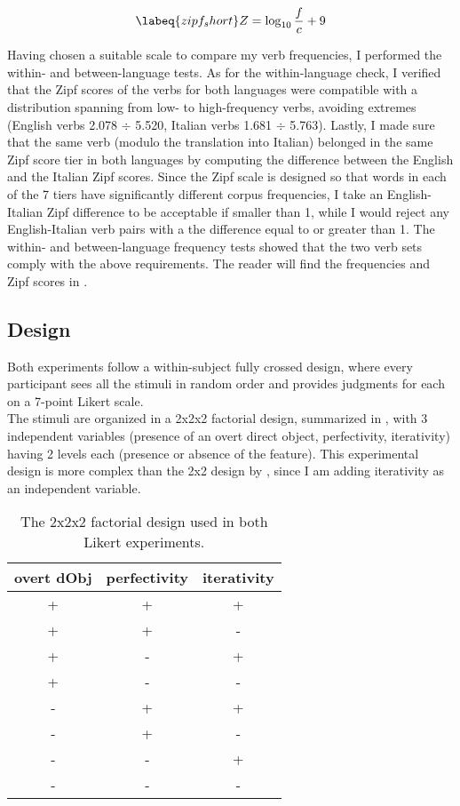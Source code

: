 \begin{equation} \labeq{zipf_short}
Z = \log _{10} \frac{f}{c} + 9
\end{equation}

Having chosen a suitable scale to compare my verb frequencies, I performed the within- and between-language tests. As for the within-language check, I verified that the Zipf scores of the verbs for both languages were compatible with a distribution spanning from low- to high-frequency verbs, avoiding extremes (English verbs 2.078 $\div$ 5.520, Italian verbs 1.681 $\div$ 5.763). Lastly, I made sure that the same verb (modulo the translation into Italian) belonged in the same Zipf score tier in both languages by computing the difference between the English and the Italian Zipf scores. Since the Zipf scale is designed so that words in each of the 7 tiers have significantly different corpus frequencies, I take an English-Italian Zipf difference to be acceptable if smaller than 1, while I would reject any English-Italian verb pairs with a the difference equal to or greater than 1. The within- and between-language frequency tests showed that the two verb sets comply with the above requirements. The reader will find the frequencies and Zipf scores in .

\subsection{Design} 

Both experiments follow a within-subject fully crossed design, where every participant sees all the stimuli in random order and provides judgments for each on a 7-point Likert scale.\\
The stimuli are organized in a 2x2x2 factorial design, summarized in , with 3 independent variables (presence of an overt direct object, perfectivity, iterativity) having 2 levels each (presence or absence of the feature). This experimental design is more complex than the 2x2 design by \textcite{Medina2007}, since I am adding iterativity as an independent variable.

\begin{table}[htb] %
\caption{The 2x2x2 factorial design used in both Likert experiments.}
\begin{tabular}{ccc}
overt dObj & perfectivity & iterativity \\
\hline
+          & +            & +           \\
+          & +            & -           \\
+          & -            & +           \\
+          & -            & -           \\
-          & +            & +           \\
-          & +            & -           \\
-          & -            & +           \\
-          & -            & -          
\end{tabular}
\end{table}


